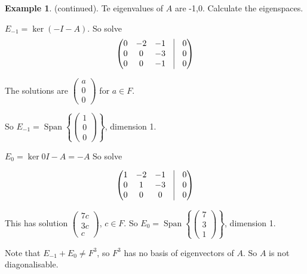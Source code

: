 \documentclass{article}
\theoremstyle{definition} \newtheorem*{definition}{Definition}
\newtheorem*{exmp}{Example} \newtheorem*{exmps}{Examples}
\DeclareMathOperator{\Span}{Span}
\begin{document}
\begin{exmp}
  (continued). Te eigenvalues of $A$ are -1,0. 
  Calculate the eigenspaces.

  $E_{-1} = \ker(-I - A)$. So solve 
  \begin{align*}
    \left( 
    \begin{matrix}
      0 & -2 & -1 &\vline &  0\\
      0 & 0 & -3 &\vline &  0\\
      0 & 0 & -1 &\vline &  0
    \end{matrix}
    \right)
  \end{align*}

  The solutions are $\left( 
  \begin{matrix}
    a \\ 0 \\ 0
  \end{matrix}
  \right)$ for $a \in F$.

  So $E_{-1} =\Span\left\{ \left( 
    \begin{matrix}
        1 \\ 0 \\ 0
        \end{matrix}
        \right)\right\}$, dimension 1.

        $E_0 = \ker 0I - A =  -A$ So solve

  \begin{align*}
    \left( 
    \begin{matrix}
      1 & -2 & -1 & \vline & 0\\
      0 & 1 & -3 & \vline & 0\\
      0 & 0 & 0 & \vline & 0
    \end{matrix}
    \right)
  \end{align*}

  This has solution $\left( 
  \begin{matrix}
    7c \\ 3c \\ c
  \end{matrix}
  \right)$, $c \in F$. So $E_0 = \Span\left\{ \left( 
    \begin{matrix}
      7 \\ 3 \\ 1
    \end{matrix}
  \right) \right\}$, dimension 1.

  Note that $E_{-1} + E_0 \neq F^{3}$, so $F^3$ has no basis of 
  eigenvectors of $A$. So $A$ is not diagonalisable.\\

\end{exmp}
\end{document}
